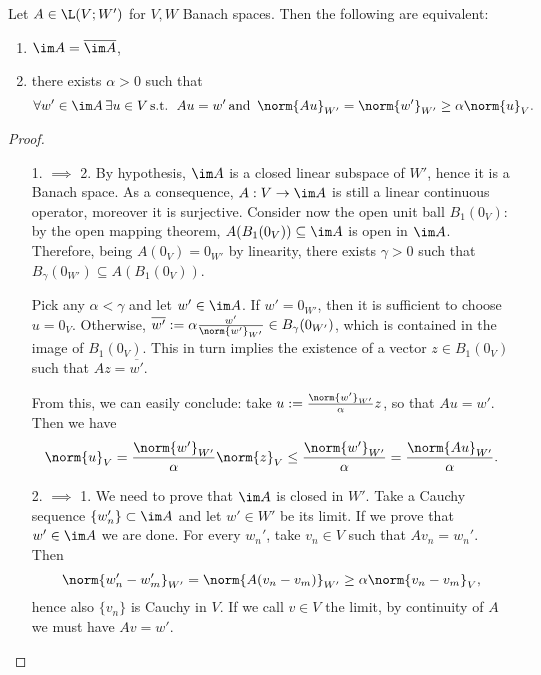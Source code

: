 \begin{theorem}\label{thm:closed_range2}
    Let $A\in\L(V;W')$ for $V,W$ Banach spaces. Then the following are equivalent:
    \begin{enumerate}
        \item $\im A = \overline{\im A}$,
        \item there exists $\alpha >0$ such that
        \begin{equation}
        	\forall w' \in \im A \, \exists u \in V \, \text{s.t. }\, Au = w' \, \text{and }\, \norm{Au}_{W'} = \norm{w'}_{W'} \ge \alpha\norm{u}_V.
        \end{equation}
    \end{enumerate}
\end{theorem}
\begin{proof}
    \hfill
    \begin{enumerate}[itemindent=25pt]
        \item[1. $\implies$ 2.] By hypothesis, $\im A$ is a closed linear subspace of $W'$, hence it is a Banach space. As a consequence, $A: V \to \im A$ is still a linear continuous operator, moreover it is surjective. Consider now the open unit ball $B_1(0_V)$: by the open mapping theorem, $A(B_1(0_V))\subseteq\im A$ is open in $\im A$. Therefore, being $A(0_V)=0_{W'}$ by linearity, there exists $\gamma>0$ such that $B_\gamma(0_{W'})\subseteq A(B_1(0_V))$.\par
        Pick any $\alpha < \gamma$ and let $w'\in \im A$. If $w' = 0_{W'}$, then it is sufficient to choose $u = 0_V$. Otherwise, $\overline{w'}:=\alpha\frac{w'}{\norm{w'}_{W'}}\in B_\gamma(0_{W'})$, which is contained in the image of $B_1(0_V)$. This in turn implies the existence of a vector $z\in B_1(0_V)$ such that $Az=\overline{w'}$.\par
        From this, we can easily conclude: take $u:=\frac{\norm{w'}_{W'}}{\alpha}z$, so that $Au=w'$. Then we have
        \begin{equation*}
            \norm{u}_V=\frac{\norm{w'}_{W'}}{\alpha}\norm{z}_V\leq\frac{\norm{w'}_{W'}}{\alpha}=\frac{\norm{Au}_{W'}}{\alpha}.
        \end{equation*}
        \item[2. $\implies$ 1.] We need to prove that $\im A$ is closed in $W'$. Take a Cauchy sequence $\{w_n'\}\subset \im A$ and let $w'\in W'$ be its limit. If we prove that $w'\in\im A$ we are done. For every $w_n'$, take $v_n\in V$ such that $Av_n=w_n'$. Then
        \begin{equation*}
            \norm{w_n'-w_m'}_{W'}=\norm{A(v_n-v_m)}_{W'}\geq\alpha\norm{v_n-v_m}_V,
        \end{equation*}
        hence also $\{v_n\}$ is Cauchy in $V$. If we call $v\in V$ the limit, by continuity of $A$ we must have $Av=w'$.
    \end{enumerate}
\end{proof}

